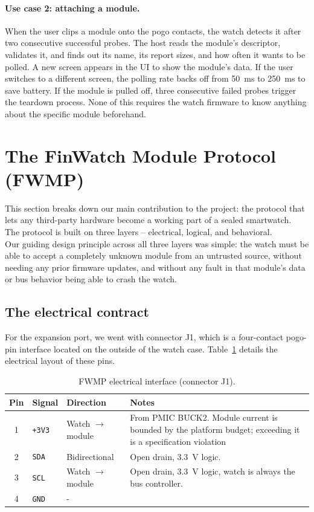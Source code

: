 \documentclass[12pt, a4paper]{article}
\begin{document}
\paragraph{Use case 2: attaching a module.} When the user clips a module onto the pogo contacts, the watch detects it after two consecutive successful probes. The host reads the module's descriptor, validates it, and finds out its name, its report sizes, and how often it wants to be polled. A new screen appears in the UI to show the module's data. If the user switches to a different screen, the polling rate backs off from \SI{50}{\milli\second} to \SI{250}{\milli\second} to save battery. If the module is pulled off, three consecutive failed probes trigger the teardown process. None of this requires the watch firmware to know anything about the specific module beforehand.

\newpage
\section{The FinWatch Module Protocol (FWMP)}
\label{sec:fwmp}

This section breaks down our main contribution to the project: the protocol that lets any third-party hardware become a working part of a sealed smartwatch.\\
The protocol is built on three layers -- electrical, logical, and behavioral.\\
Our guiding design principle across all three layers was simple: the watch must be able to accept a completely unknown module from an untrusted source, without needing any prior firmware updates, and without any fault in that module's data or bus behavior being able to crash the watch.

\subsection{The electrical contract}

For the expansion port, we went with connector J1, which is a four-contact pogo-pin interface located on the outside of the watch case. Table~\ref{tab:j1} details the electrical layout of these pins.

\begin{table}[H]
\centering
\small
\begin{tabular}{@{}c l l p{7.4cm}@{}}
\toprule
\textbf{Pin} & \textbf{Signal} & \textbf{Direction} & \textbf{Notes} \\
\midrule
1 & \texttt{+3V3} & Watch $\to$ module & From PMIC BUCK2. Module current is bounded by the platform budget; exceeding it is a specification violation \\
2 & \texttt{SDA} & Bidirectional & Open drain, \SI{3.3}{\volt} logic. \\
3 & \texttt{SCL} & Watch $\to$ module & Open drain, \SI{3.3}{\volt} logic, watch is always the bus controller. \\
4 & \texttt{GND} & - & \\
\bottomrule
\end{tabular}
\caption{FWMP electrical interface (connector J1).}
\label{tab:j1}
\end{table}
\end{document}
